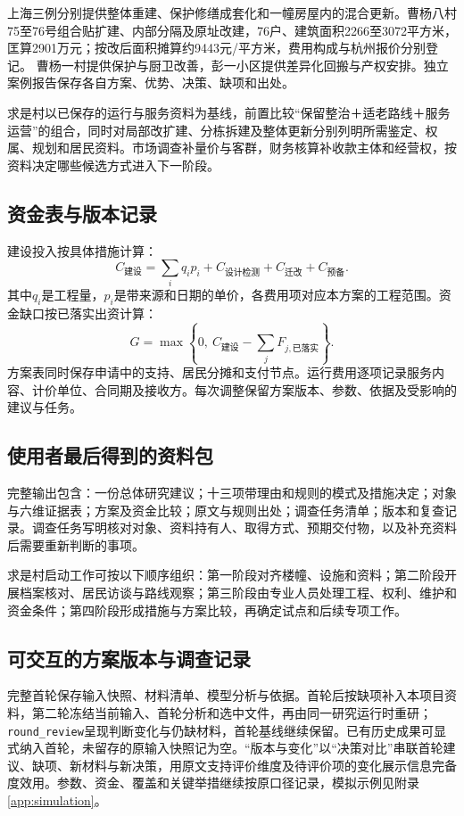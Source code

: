 \documentclass[UTF8,11pt,fontset=windows]{ctexart}
\begin{document}
上海三例分别提供整体重建、保护修缮成套化和一幢房屋内的混合更新。曹杨八村75至76号组合贴扩建、内部分隔及原址改建，76户、建筑面积2266至3072平方米，匡算2901万元；按改后面积摊算约9443元/平方米，费用构成与杭州报价分别登记。\cite{shmix} 曹杨一村提供保护与厨卫改善，彭一小区提供差异化回搬与产权安排。独立案例报告保存各自方案、优势、决策、缺项和出处。

求是村以已保存的运行与服务资料为基线，前置比较“保留整治＋适老路线＋服务运营”的组合，同时对局部改扩建、分栋拆建及整体更新分别列明所需鉴定、权属、规划和居民资料。市场调查补量价与客群，财务核算补收款主体和经营权，按资料决定哪些候选方式进入下一阶段。

\subsection{资金表与版本记录}

建设投入按具体措施计算：
\[
C_{\text{建设}}=\sum_i q_i p_i+C_{\text{设计检测}}+C_{\text{迁改}}+C_{\text{预备}}.
\]
其中$q_i$是工程量，$p_i$是带来源和日期的单价，各费用项对应本方案的工程范围。资金缺口按已落实出资计算：
\[
G=\max\left\{0,\ C_{\text{建设}}-\sum_j F_{j,\text{已落实}}\right\}.
\]
方案表同时保存申请中的支持、居民分摊和支付节点。运行费用逐项记录服务内容、计价单位、合同期及接收方。每次调整保留方案版本、参数、依据及受影响的建议与任务。

\subsection{使用者最后得到的资料包}

完整输出包含：一份总体研究建议；十三项带理由和规则的模式及措施决定；对象与六维证据表；方案及资金比较；原文与规则出处；调查任务清单；版本和复查记录。调查任务写明核对对象、资料持有人、取得方式、预期交付物，以及补充资料后需要重新判断的事项。

求是村启动工作可按以下顺序组织：第一阶段对齐楼幢、设施和资料；第二阶段开展档案核对、居民访谈与路线观察；第三阶段由专业人员处理工程、权利、维护和资金条件；第四阶段形成措施与方案比较，再确定试点和后续专项工作。

\subsection{可交互的方案版本与调查记录}

完整首轮保存输入快照、材料清单、模型分析与依据。首轮后按缺项补入本项目资料，第二轮冻结当前输入、首轮分析和选中文件，再由同一研究运行时重研；\texttt{round\_review}呈现判断变化与仍缺材料，首轮基线继续保留。已有历史成果可显式纳入首轮，未留存的原输入快照记为空。“版本与变化”以“决策对比”串联首轮建议、缺项、新材料与新决策，用原文支持评价维度及待评价项的变化展示信息完备度效用。参数、资金、覆盖和关键举措继续按原口径记录，模拟示例见附录\ref{app:simulation}。
\end{document}

